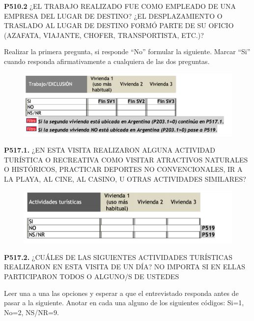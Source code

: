 \documentclass[
  openany]{book}
\begin{document}
\textbf{P510.2} ¿EL TRABAJO REALIZADO FUE COMO EMPLEADO DE UNA EMPRESA DEL LUGAR DE DESTINO?
¿EL DESPLAZAMIENTO O TRASLADO AL LUGAR DE DESTINO FORMÓ PARTE DE SU OFICIO (AZAFATA, VIAJANTE, CHOFER, TRANSPORTISTA, ETC.)?

Realizar la primera pregunta, si responde ``No'' formular la siguiente. Marcar ``Si'' cuando responda afirmativamente a cualquiera de las dos preguntas.

\begin{figure}

{\centering \includegraphics[width=1\linewidth]{imagenes/figura6-198} 

}

\end{figure}

\textbf{P517.1.} ¿EN ESTA VISITA REALIZARON ALGUNA ACTIVIDAD TURÍSTICA O RECREATIVA COMO VISITAR ATRACTIVOS NATURALES O HISTÓRICOS, PRACTICAR DEPORTES NO CONVENCIONALES, IR A LA PLAYA, AL CINE, AL CASINO, U OTRAS ACTIVIDADES SIMILARES?

\begin{figure}

{\centering \includegraphics[width=1\linewidth]{imagenes/figura6-199} 

}

\end{figure}

\textbf{P517.2.} ¿CUÁLES DE LAS SIGUIENTES ACTIVIDADES TURÍSTICAS REALIZARON EN ESTA VISITA DE UN DÍA? NO IMPORTA SI EN ELLAS PARTICIPARON TODOS O ALGUNO/S DE USTEDES

Leer una a una las opciones y esperar a que el entrevistado responda antes de pasar a la siguiente. Anotar en cada una alguno de los siguientes códigos: Si=1, No=2, NS/NR=9.
\end{document}
